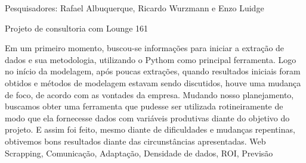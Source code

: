 \documentclass[
    10pt, 
    a4paper, 
    draft
    ]{article}
\begin{document}


    {\noindent Pesquisadores:  Rafael Albuquerque, Ricardo Wurzmann e Enzo Luidge
    
    \noindent Projeto de consultoria com Lounge 161
    }
    {Em um primeiro momento, buscou-se informações para iniciar a extração de dados e sua metodologia, utilizando o Pythom como principal ferramenta. Logo no início da modelagem, após poucas extrações, quando resultados iniciais foram obtidos e métodos de modelagem estavam sendo discutidos, houve uma mudança de foco, de acordo com as vontades da empresa. Mudando nosso planejamento, buscamos obter uma ferramenta 
    que pudesse ser utilizada rotineiramente de modo que ela fornecesse dados com variáveis produtivas diante do objetivo do projeto. E assim foi feito, mesmo diante de dificuldades e mudanças repentinas, obtivemos bons resultados diante das circunstâncias apresentadas.}
    {Web Scrapping, Comunicação, Adaptação, Densidade de dados, ROI, Previsão
    }




\clearpage

\nocite{*}

\printbibliography

\appendix
\end{document}
